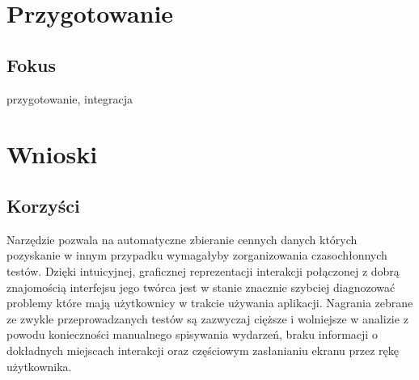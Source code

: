 \section{Przygotowanie}

\subsection{Fokus}
przygotowanie, integracja 

\section{Wnioski}

\subsection{Korzyści}
Narzędzie pozwala na automatyczne zbieranie cennych danych których pozyskanie w innym przypadku wymagałyby zorganizowania czasochłonnych testów. Dzięki intuicyjnej, graficznej reprezentacji interakcji połączonej z dobrą znajomością interfejsu jego twórca jest w stanie znacznie szybciej diagnozować problemy które mają użytkownicy w trakcie używania aplikacji. Nagrania zebrane ze zwykle przeprowadzanych testów są zazwyczaj cięższe i wolniejsze w analizie z powodu konieczności manualnego spisywania wydarzeń, braku informacji o dokładnych miejscach interakcji oraz częściowym zasłanianiu ekranu przez rękę użytkownika. 
